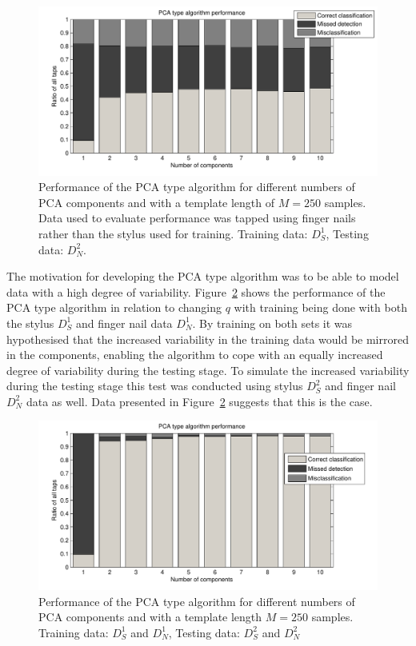 \begin{figure}[!] %
\centering
\includegraphics[width=150mm]{PCAperformNail.pdf}
\caption{Performance of the PCA type algorithm for different numbers of PCA components and with a template length of $M=250$ samples. Data used to evaluate performance was tapped using finger nails rather than the stylus used for training. Training data: $D^1_S$, Testing data: $D^2_N$.}\label{fig:PCAperformNail}
\end{figure}

The motivation for developing the PCA type algorithm was to be able to model data with a high degree of variability. Figure~\ref{fig:PCAperform_SN-SN} shows the performance of the PCA type algorithm in relation to changing $q$ with training being done with both the stylus $D^1_S$ and finger nail data $D^1_N$. By training on both sets it was hypothesised that the increased variability in the training data would be mirrored in the components, enabling the algorithm to cope with an equally increased degree of variability during the testing stage. To simulate the increased variability during the testing stage this test was conducted using stylus $D^2_S$ and finger nail $D^2_N$ data as well. Data presented in Figure~\ref{fig:PCAperform_SN-SN} suggests that this is the case.

\begin{figure}[!] %
\centering
\includegraphics[width=150mm]{PCAperform_SN-SN.pdf}
\caption{Performance of the PCA type algorithm for different numbers of PCA components and with a template length $M=250$ samples. Training data: $D^1_S$ and $D^1_N$, Testing data: $D^2_S$ and $D^2_N$}\label{fig:PCAperform_SN-SN}
\end{figure}

